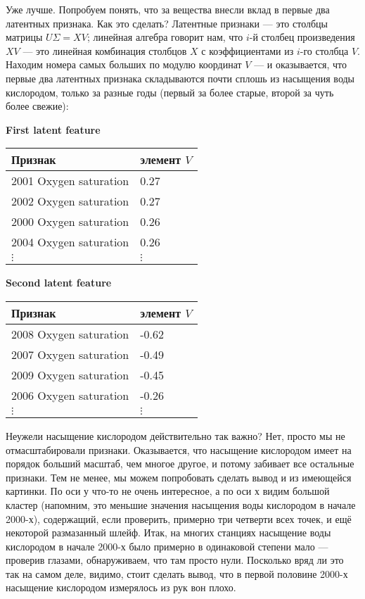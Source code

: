 \documentclass{amsart}
\theoremstyle{definition}
\theoremstyle{remark}
\numberwithin{equation}{section}
\begin{document}
Уже лучше. Попробуем понять, что за вещества внесли вклад в первые два латентных признака. Как это сделать? Латентные признаки --- это столбцы матрицы $U\Sigma = XV$; линейная алгебра говорит нам, что $i$-й столбец произведения $XV$ --- это линейная комбинация столбцов $X$ с коэффициентами из $i$-го столбца $V$. Находим номера самых больших по модулю координат $V$ --- и оказывается, что первые два латентных признака складываются почти сплошь из насыщения воды кислородом, только за разные годы (первый за более старые, второй за чуть более свежие):

\begin{center}
\textbf{First latent feature}

\begin{tabular}{|l|l|}
\hline
Признак & элемент $V$\\
\hline
2001 Oxygen saturation & 0.27\\
\hline
2002 Oxygen saturation & 0.27\\
\hline
2000 Oxygen saturation & 0.26\\
\hline
2004 Oxygen saturation & 0.26\\
\hline
$\vdots$ & $\vdots$\\
\hline
\end{tabular}

\medskip

\textbf{Second latent feature}

\begin{tabular}{|l|l|}
\hline
Признак & элемент $V$\\
\hline
2008 Oxygen saturation & -0.62\\
2007 Oxygen saturation & -0.49\\
2009 Oxygen saturation & -0.45\\
2006 Oxygen saturation & -0.26\\
\hline
$\vdots$ & $\vdots$\\
\hline
\end{tabular}

\end{center}

Неужели насыщение кислородом действительно так важно? Нет, просто мы не отмасштабировали признаки. Оказывается, что насыщение кислородом имеет на порядок больший масштаб, чем многое другое, и потому забивает все остальные признаки. Тем не менее, мы можем попробовать сделать вывод и из имеющейся картинки. По оси у что-то не очень интересное, а по оси х видим большой кластер (напомним, это меньшие значения насыщения воды кислородом в начале 2000-х), содержащий, если проверить, примерно три четверти всех точек, и ещё некоторой размазанный шлейф. Итак, на многих станциях насыщение воды кислородом в начале 2000-х было примерно в одинаковой степени мало --- проверив глазами, обнаруживаем, что там просто нули. Посколько вряд ли это так на самом деле, видимо, стоит сделать вывод, что в первой половине 2000-х насыщение кислородом измерялось из рук вон плохо.
\end{document}
